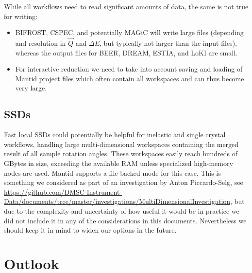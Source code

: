 \documentclass[a4paper,english,numbers=noenddot,bibliography=totoc,chapterprefix=on,DIV=12]{scrartcl}
\newcommand{\beer}{BEER\xspace}
\newcommand{\bifrost}{BIFROST\xspace}
\newcommand{\cspec}{CSPEC\xspace}
\newcommand{\dream}{DREAM\xspace}
\newcommand{\estia}{ESTIA\xspace}
\newcommand{\loki}{LoKI\xspace}
\newcommand{\magic}{MAGiC\xspace}
\newcommand{\mantid}{Mantid\xspace}
\begin{document}
While all workflows need to read significant amounts of data, the same is not true for writing:
\begin{itemize}
  \item \bifrost, \cspec, and potentially \magic will write large files (depending and resolution in $\vec Q$ and $\Delta E$, but typically not larger than the input files), whereas the output files for \beer, \dream, \estia, and \loki are small.
  \item For interactive reduction we need to take into account saving and loading of \mantid project files which often contain all workspaces and can thus become very large.
\end{itemize}


\subsection{SSDs}

Fast local SSDs could potentially be helpful for inelastic and single crystal workflows, handling large multi-dimensional workspaces containing the merged result of all sample rotation angles.
These workspaces easily reach hundreds of GBytes in size, exceeding the available RAM unless specialized high-memory nodes are used.
\mantid supports a file-backed mode for this case.
This is something we considered as part of an investigation by Anton Piccardo-Selg, see \url{https://github.com/DMSC-Instrument-Data/documents/tree/master/investigations/MultiDimensionalInvestigation}, but due to the complexity and uncertainty of how useful it would be in practice we did not include it in any of the considerations in this documents.
Nevertheless we should keep it in mind to widen our options in the future.




\section{Outlook}
\end{document}
